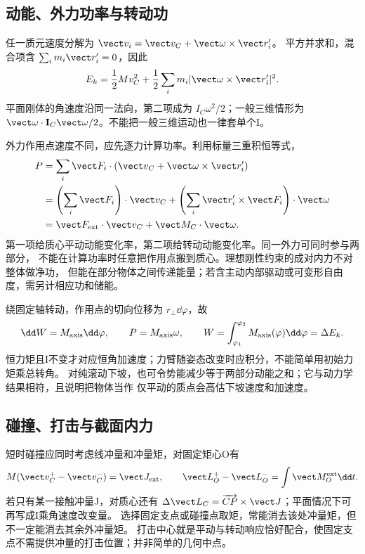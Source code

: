 \subsection{动能、外力功率与转动功}
任一质元速度分解为 $\vect v_i=\vect v_C+\vect\omega\times\vect r_i'$。
平方并求和，混合项含 $\sum_i m_i\vect r_i'=0$，因此
\begin{equation}
 E_k=\frac12Mv_C^2+\frac12\sum_i m_i|\vect\omega\times\vect r_i'|^2.
\end{equation}
平面刚体的角速度沿同一法向，第二项成为 $I_C\omega^2/2$；一般三维情形为
$\vect\omega\cdot\mathbf I_C\vect\omega/2$。不能把一般三维运动也一律套单个I。

外力作用点速度不同，应先逐力计算功率。利用标量三重积恒等式，
\begin{align}
 P&=\sum_i\vect F_i\cdot(\vect v_C+\vect\omega\times\vect r_i')\\
 &=\left(\sum_i\vect F_i\right)\cdot\vect v_C+
 \left(\sum_i\vect r_i'\times\vect F_i\right)\cdot\vect\omega\\
 &=\vect F_{\rm ext}\cdot\vect v_C+\vect M_C\cdot\vect\omega.
\end{align}
第一项给质心平动动能变化率，第二项给转动动能变化率。同一外力可同时参与两部分，
不能在计算功率时任意把作用点搬到质心。理想刚性约束的成对内力不对整体做净功，
但能在部分物体之间传递能量；若含主动内部驱动或可变形自由度，需另计相应功和储能。

绕固定轴转动，作用点的切向位移为 $r_\perp\dd\varphi$，故
\begin{equation}
 \dd W=M_{\rm axis}\dd\varphi,\qquad P=M_{\rm axis}\omega,
 \qquad W=\int_{\varphi_1}^{\varphi_2}M_{\rm axis}(\varphi)\dd\varphi=\Delta E_k.
\end{equation}
恒力矩且I不变才对应恒角加速度；力臂随姿态改变时应积分，不能简单用初始力矩乘总转角。
对纯滚动下坡，也可令势能减少等于两部分动能之和；它与动力学结果相符，且说明把物体当作
仅平动的质点会高估下坡速度和加速度。

\subsection{碰撞、打击与截面内力}
短时碰撞应同时考虑线冲量和冲量矩，对固定矩心O有
\begin{equation}
 M(\vect v_C^+-\vect v_C^-)=\vect J_{\rm ext},\qquad
 \vect L_O^+-\vect L_O^-=\int\vect M_O^{\rm ext}\dd t.
\end{equation}
若只有某一接触冲量J，对质心还有
$\Delta\vect L_C=\overrightarrow{CP}\times\vect J$；平面情况下可再写成I乘角速度改变量。
选择固定支点或碰撞点取矩，常能消去该处冲量矩，但不一定能消去其余外冲量矩。
打击中心就是平动与转动响应恰好配合，使固定支点不需提供冲量的打击位置；并非简单的几何中点。

